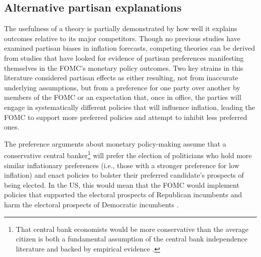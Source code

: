 \documentclass[a4paper]{article}\usepackage[]{graphicx}\usepackage[]{color}
\begin{document}

\subsection{Alternative partisan explanations}

The usefulness of a theory is partially demonstrated by how well it explains outcomes relative to its major competitors. Though no previous studies have examined partisan biases in inflation forecasts, competing theories can be derived from studies that have looked for evidence of partisan preferences manifesting themselves in the FOMC's monetary policy outcomes. Two key strains in this literature considered partisan effects as either resulting, not from inaccurate underlying assumptions, but from a preference for one party over another by members of the FOMC or an expectation that, once in office, the parties will engage in systematically different policies that will influence inflation, leading the FOMC to support more preferred policies and attempt to inhibit less preferred ones. 

The preference arguments about monetary policy-making assume that a conservative central banker\footnote{That central bank economists would be more conservative than the average citizen is both a fundamental assumption of the central bank independence literature \citep[e.g.][]{Goodman1991} and backed by empirical evidence \citep[e.g.,][]{Scott1975,Stigler1959}.} will prefer the election of politicians who hold more similar inflationary preferences (i.e., those with a stronger preference for low inflation) and enact policies to bolster their preferred candidate's prospects of being elected. In the US, this would mean that the FOMC would implement policies that supported the electoral prospects of Republican incumbents and harm the electoral prospects of Democratic incumbents \citep{Clark2012,Hakes1988,Sieg1997,Tootell1996}.
\end{document}
